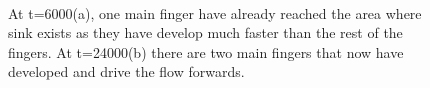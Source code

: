 \documentclass[preprint,authoryear,12pt]{elsarticle}
\begin{document}
\begin{figure}
\centering
{}\\[2mm]%
%
\caption{At t=6000(a), one main finger have already reached the area where sink exists as they have develop much faster than the rest of the fingers. At t=24000(b) there are two main fingers that now have developed and drive the flow forwards.}
\label{fig:3c_heteheleshaw_10}
\end{figure}

\end{document}
